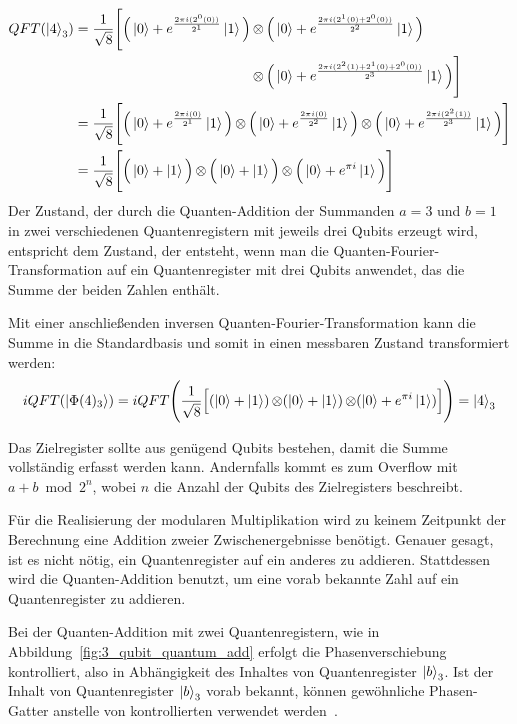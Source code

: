 \begin{align*}
    QFT(\ket{4}_3) &=
    \begin{aligned}[t]
      \frac{1}{\sqrt{8}} \Bigg[ \Big(\ket{0} + { e^{\frac{2 \pi i (2^0(0))}{2^1}}}\ket{1} \Big) 
      &\operatorname{\otimes}
      \Big( \ket{0} + { e^{\frac{2 \pi i (2^1(0)+2^0(0))}{2^2}}}\ket{1} \Big) \\
      &\operatorname{\otimes}
      \Big( \ket{0} + { e^{\frac{2 \pi i (2^{2}(1) +2^1(0)+2^0(0))}{2^3}}}\ket{1} \Big) \Bigg]
    \end{aligned} \\
    &= 
    \frac{1}{\sqrt{8}} \Bigg[ \Big(\ket{0} + { e^{\frac{2 \pi i (0)}{2^1}}}\ket{1} \Big) 
    \operatorname{\otimes}
    \Big( \ket{0} + { e^{\frac{2 \pi i (0)}{2^2}}}\ket{1} \Big) 
    \operatorname{\otimes}
    \Big( \ket{0} + { e^{\frac{2 \pi i (2^{2}(1))}{2^3}}}\ket{1} \Big) \Bigg] \\
    &=\frac{1}{\sqrt{8}} \Bigg[ \Big(\ket{0} + \ket{1} \Big) 
    \operatorname{\otimes}
    \Big( \ket{0} +   \ket{1} \Big) 
    \operatorname{\otimes}
    \Big( \ket{0} +  e^{\pi i }\ket{1} \Big) \Bigg]
\end{align*}
Der Zustand, 
der durch die Quanten-Addition der Summanden \(a=3\) und 
\(b=1\) in zwei verschiedenen Quantenregistern mit jeweils drei Qubits erzeugt wird, 
entspricht dem Zustand, der entsteht, 
wenn man die Quanten-Fourier-Transformation auf ein Quantenregister mit drei Qubits anwendet, 
das die Summe der beiden Zahlen enthält.

Mit einer anschließenden inversen Quanten-Fourier-Transformation 
kann die Summe in die Standardbasis und somit in einen messbaren Zustand transformiert werden:
\[
iQFT(\ket{\Phi(4)_3})
=
 iQFT \Bigg(\frac{1}{\sqrt{8}} \Big[ (\ket{0} + \ket{1} ) \operatorname{\otimes}
( \ket{0} +   \ket{1} ) \operatorname{\otimes}
( \ket{0} +  e^{\pi i }\ket{1} ) \Big]\Bigg) 
=
\ket{4}_3
\]

Das Zielregister sollte aus genügend Qubits bestehen, 
damit die Summe vollständig erfasst werden kann.
Andernfalls kommt es zum Overflow mit \(a + b \bmod 2^n\), 
wobei \(n\) die Anzahl der Qubits des Zielregisters beschreibt.

Für die Realisierung der modularen Multiplikation wird zu keinem Zeitpunkt der Berechnung eine Addition zweier Zwischenergebnisse benötigt. 
Genauer gesagt, ist es nicht nötig, ein Quantenregister auf ein anderes zu addieren. 
Stattdessen wird die Quanten-Addition benutzt, um eine vorab bekannte Zahl auf ein Quantenregister zu addieren.

Bei der Quanten-Addition mit zwei Quantenregistern, 
wie in Abbildung~\ref{fig:3_qubit_quantum_add} erfolgt die Phasenverschiebung kontrolliert,  
also in Abhängigkeit des Inhaltes von Quantenregister \(\ket{b}_3\).
Ist der Inhalt von Quantenregister \(\ket{b}_3\) vorab bekannt,
können gewöhnliche Phasen-Gatter anstelle von kontrollierten verwendet werden~\cite{beauregard2003circuit}.

